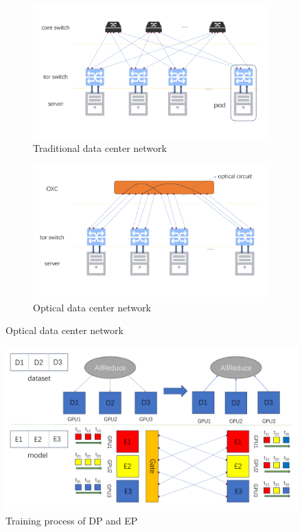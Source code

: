 \documentclass[conference]{IEEEtran}
\begin{document}
\begin{figure}[htbp]
	\centering
	\begin{subfigure}
		\centering
		\includegraphics[width=\linewidth]{./figure/picture1.pdf}
		\caption{Traditional data center network}
		\label{fig:sub1}
	\end{subfigure}
	\begin{subfigure}
		\centering
		\includegraphics[width=\linewidth]{./figure/picture2.pdf}
		\caption{Optical data center network}
		\label{fig:sub2}
	\end{subfigure}
	\label{fig:total}
\end{figure}
\begin{figure}
	\centering
	\includegraphics[width=1\linewidth]{figure/picture4}
	\caption{Training process of DP and EP}
	\label{fig:picture4}
\end{figure}
\end{document}

